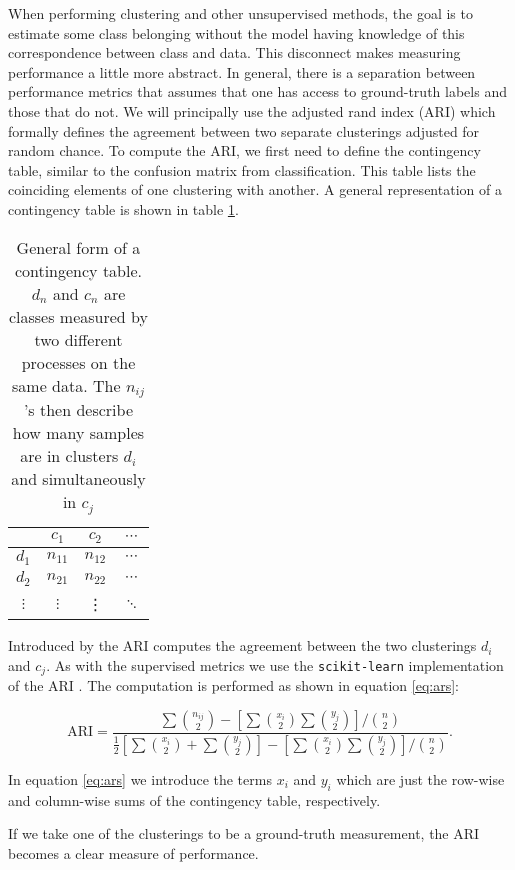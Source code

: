 When performing clustering and other unsupervised methods, the goal is to estimate some class belonging without the model having knowledge of this correspondence between class and data. This disconnect makes measuring performance a little more abstract. In general, there is a separation between performance metrics that assumes that one has access to ground-truth labels and those that do not. We will principally use the adjusted rand index (ARI) which formally defines the agreement between two separate clusterings adjusted for random chance. To compute the ARI, we first need to define the contingency table, similar to the confusion matrix from classification. This table lists the coinciding elements of one clustering with another. A general representation of a contingency table is shown in table \ref{tab:contingency}. 

\begin{table}
\centering
\caption{General form of a contingency table. $d_n$ and $c_n$ are classes measured by two different processes on the same data. The $n_{ij}$'s then describe how many samples are in clusters $d_i$ and simultaneously in $c_j$}\label{tab:contingency}
\begin{tabular}{c|ccc}
& $c_1$ &$c_2$ & $\cdots$\\
\midrule
$d_1$ & $n_{11}$ & $n_{12}$ &  $\cdots$ \\
$d_2$ & $n_{21}$ & $n_{22}$ &  $\cdots$ \\
$\vdots$ & $\vdots$ & \vdots & $\ddots$ \\
\end{tabular}
\end{table}

Introduced by \cite{Hubert1985} the ARI computes the agreement between the two clusterings $d_i$ and $c_j$. As with the supervised metrics we use the \lstinline{scikit-learn} implementation of the ARI \cite{Pedregosa2011}. The computation is performed as shown in equation \ref{eq:ars}:

\begin{equation}\label{eq:ars}
\text{ARI} = \frac{\sum  \binom{n_{ij}}{2} - \left[\sum  \binom{x_{i}}{2} \sum  \binom{y_{j}}{2}  \right]/\binom{n}{2}}{\frac{1}{2}\left[\sum  \binom{x_{i}}{2} + \sum  \binom{y_{j}}{2}  \right]- \left[\sum  \binom{x_{i}}{2} \sum  \binom{y_{j}}{2}  \right]/\binom{n}{2}}.
\end{equation}

\noindent In equation \ref{eq:ars} we introduce the terms $x_i$ and $y_i$ which are just the row-wise and column-wise sums of the contingency table, respectively.

If we take one of the clusterings to be a ground-truth measurement, the ARI becomes a clear measure of performance. 